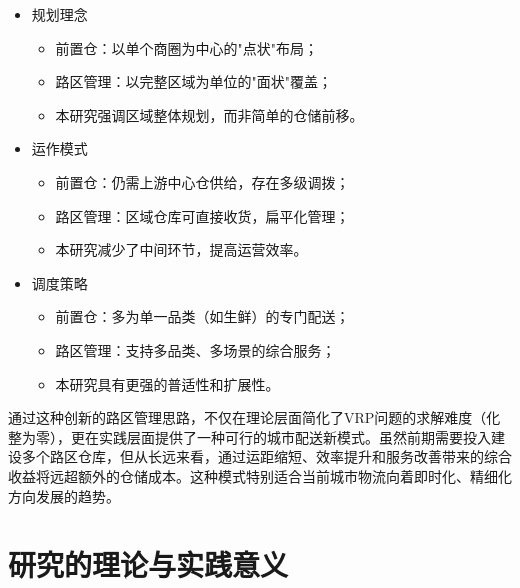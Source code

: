 \documentclass[12pt,a4paper,twoside]{ctexbook}
\begin{document}
\begin{itemize}
    \item 规划理念
    \begin{itemize}
        \item 前置仓：以单个商圈为中心的"点状"布局；
        \item 路区管理：以完整区域为单位的"面状"覆盖；
        \item 本研究强调区域整体规划，而非简单的仓储前移。
    \end{itemize}
    
    \item 运作模式
    \begin{itemize}
        \item 前置仓：仍需上游中心仓供给，存在多级调拨；
        \item 路区管理：区域仓库可直接收货，扁平化管理；
        \item 本研究减少了中间环节，提高运营效率。
    \end{itemize}
    
    \item 调度策略
    \begin{itemize}
        \item 前置仓：多为单一品类（如生鲜）的专门配送；
        \item 路区管理：支持多品类、多场景的综合服务；
        \item 本研究具有更强的普适性和扩展性。
    \end{itemize}
\end{itemize}

通过这种创新的路区管理思路，不仅在理论层面简化了VRP问题的求解难度（化整为零），更在实践层面提供了一种可行的城市配送新模式。虽然前期需要投入建设多个路区仓库，但从长远来看，通过运距缩短、效率提升和服务改善带来的综合收益将远超额外的仓储成本。这种模式特别适合当前城市物流向着即时化、精细化方向发展的趋势。

\section{研究的理论与实践意义}
\end{document}
